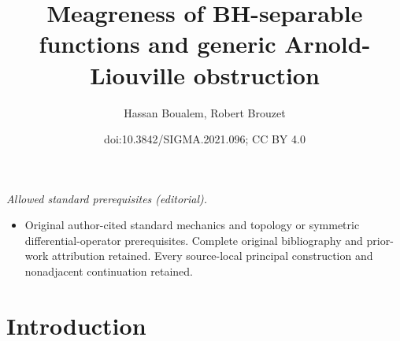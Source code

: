 \documentclass[10pt,a4paper]{amsart}
\title{Meagreness of BH-separable functions and generic Arnold-Liouville obstruction}
\author{Hassan Boualem, Robert Brouzet}
\date{doi:10.3842/SIGMA.2021.096; CC BY 4.0}
\numberwithin{equation}{section}
\begin{document}
\maketitle
\noindent\textit{Allowed standard prerequisites (editorial).}\begin{itemize}
\item Original author-cited standard mechanics and topology or symmetric differential-operator prerequisites. Complete original bibliography and prior-work attribution retained. Every source-local principal construction and nonadjacent continuation retained.
\end{itemize}\medskip
\section{Introduction}
\end{document}
